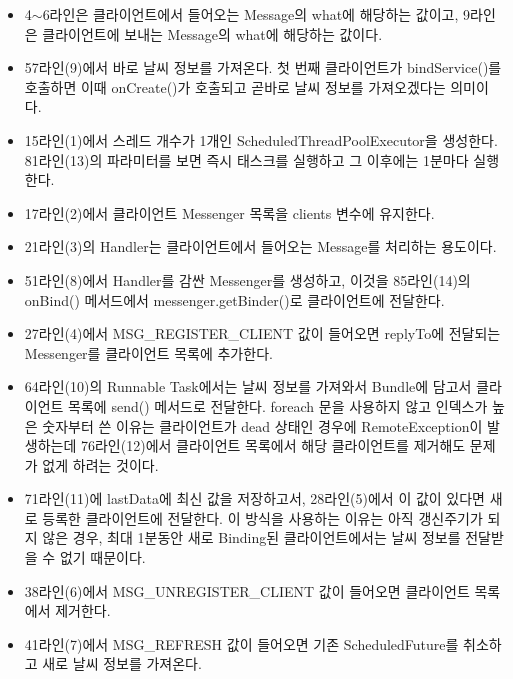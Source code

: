 \begin{itemize}
\item 4$\sim$6라인은 클라이언트에서 들어오는 Message의 what에 해당하는 값이고, 9라인은 클라이언트에 보내는 Message의 what에 해당하는 값이다.
\item 57라인(9)에서 바로 날씨 정보를 가져온다. 첫 번째 클라이언트가 bindService()를 호출하면 이때 onCreate()가 호출되고 곧바로 날씨 정보를 가져오겠다는 의미이다.
\item 15라인(1)에서 스레드 개수가 1개인 ScheduledThreadPoolExecutor을 생성한다. 81라인(13)의 파라미터를 보면 즉시 태스크를 실행하고 그 이후에는 1분마다 실행한다.
\item 17라인(2)에서 클라이언트 Messenger 목록을 clients 변수에 유지한다.
\item 21라인(3)의 Handler는 클라이언트에서 들어오는 Message를 처리하는 용도이다.
\item 51라인(8)에서 Handler를 감싼 Messenger를 생성하고, 이것을 85라인(14)의 onBind() 메서드에서 messenger.getBinder()로 클라이언트에 전달한다.
\item 27라인(4)에서 MSG\_REGISTER\_CLIENT 값이 들어오면 replyTo에 전달되는 Messenger를 클라이언트 목록에 추가한다.
\item 64라인(10)의 Runnable Task에서는 날씨 정보를 가져와서 Bundle에 담고서 클라이언트 목록에 send() 메서드로 전달한다. foreach 문을 사용하지 않고 인덱스가 높은 숫자부터 쓴 이유는 클라이언트가 dead 상태인 경우에 RemoteException이 발생하는데 76라인(12)에서 클라이언트 목록에서 해당 클라이언트를 제거해도 문제가 없게 하려는 것이다.
\item 71라인(11)에 lastData에 최신 값을 저장하고서, 28라인(5)에서 이 값이 있다면 새로 등록한 클라이언트에 전달한다. 이 방식을 사용하는 이유는 아직 갱신주기가 되지 않은 경우, 최대 1분동안 새로 Binding된 클라이언트에서는 날씨 정보를 전달받을 수 없기 때문이다.
\item 38라인(6)에서 MSG\_UNREGISTER\_CLIENT 값이 들어오면 클라이언트 목록에서 제거한다.
\item 41라인(7)에서 MSG\_REFRESH 값이 들어오면 기존 ScheduledFuture를 취소하고 새로 날씨 정보를 가져온다.
\end{itemize}

